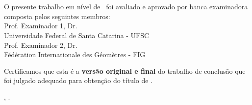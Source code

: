 \documentclass[
	12pt,				%
	oneside,			%
	a4paper,			%
	chapter=TITLE,		%
	section=TITLE,		%
	english,			%
	brazil				%
	]{abntex2}
\begin{document}
\begin{folhadeaprovacao}
	\OnehalfSpacing
	\centering
	\imprimirautor\\%
	\vspace*{10pt}		
	\textbf{\imprimirtitulo}%
	\ifnotempty{\imprimirsubtitulo}{:~\imprimirsubtitulo}\\%
	\vspace*{\baselineskip}
	O presente trabalho em nível de \imprimirnivel~foi avaliado e aprovado por banca examinadora composta pelos seguintes membros:\\
	\vspace*{\baselineskip}
    Prof. Examinador 1, Dr.\\
  Universidade Federal de Santa Catarina - UFSC\\
  \vspace*{\baselineskip}
    Prof. Examinador 2, Dr.\\
  Fédération Internationale des Géomètres - FIG\\
  \vspace*{\baselineskip}
    
	\vspace*{2\baselineskip}
	\begin{minipage}{\textwidth}
		Certificamos que esta é a \textbf{versão original e final} do trabalho de conclusão que foi julgado adequado para obtenção do título de \imprimirformacao.\\
	\end{minipage}
	\vspace*{\fill}
	\vspace*{\fill}
	\assinatura{\OnehalfSpacing\imprimirorientador \\ \imprimirorientadorRotulo}
	\vspace*{\fill}
	\imprimirlocal, \imprimirano.
\end{folhadeaprovacao}
\end{document}
